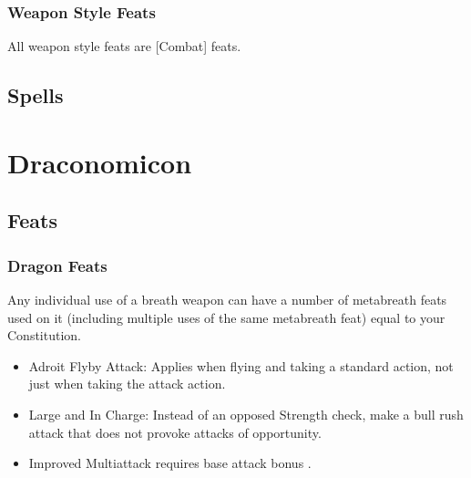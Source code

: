 \subsubsection{Weapon Style Feats}
All weapon style feats are [Combat] feats.
\subsection{Spells}
\section{Draconomicon}
\subsection{Feats}
\subsubsection{Dragon Feats}
Any individual use of a breath weapon can have a number of metabreath feats used on it (including multiple uses of the same metabreath feat) equal to your Constitution.
\begin{itemize}
\item Adroit Flyby Attack: Applies when flying and taking a standard action, not just when taking the attack action.
\item Large and In Charge: Instead of an opposed Strength check, make a bull rush attack that does not provoke attacks of opportunity.
\item Improved Multiattack requires base attack bonus .
\end{itemize}

